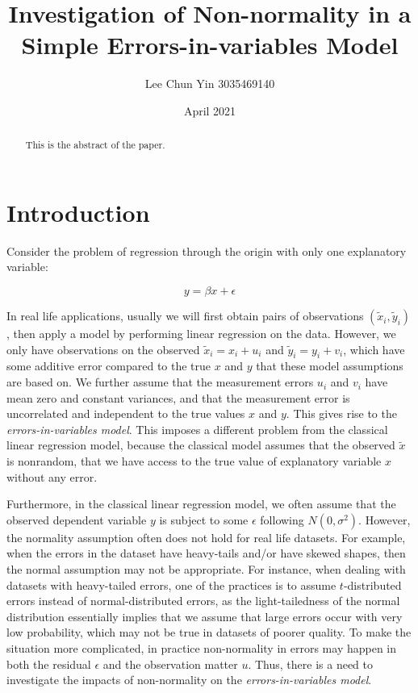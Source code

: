 \documentclass{article}
\title{Investigation of Non-normality in a Simple Errors-in-variables Model}
\author{Lee Chun Yin 3035469140}
\date{April 2021}
\begin{document}
\maketitle

\begin{abstract}
    This is the abstract of the paper.
\end{abstract}

\section{Introduction}

Consider the problem of regression through the origin with only one explanatory variable:

\begin{equation}
y = \beta x + \epsilon
\end{equation}

In real life applications, usually we will first obtain pairs of observations $(\tilde{x}_i, \tilde{y}_i)$, then apply a model by performing linear regression on the data.
However, we only have observations on the observed $\tilde{x}_i = x_i + u_i$ and $\tilde{y}_i = y_i + v_i$, which have some additive error compared to the true $x$ and $y$ that these model assumptions are based on.
We further assume that the measurement errors $u_i$ and $v_i$ have mean zero and constant variances, and that the measurement error is uncorrelated and independent to the true values $x$ and $y$.
This gives rise to the \textit{errors-in-variables model}.
This imposes a different problem from the classical linear regression model, because the classical model assumes that the observed $\tilde{x}$ is nonrandom, that we have access to the true value of explanatory variable $x$ without any error. 

Furthermore, in the classical linear regression model, we often assume that the observed dependent variable $y$ is subject to some $\epsilon$ following $N(0, \sigma^2)$.
However, the normality assumption often does not hold for real life datasets.
For example, when the errors in the dataset have heavy-tails and/or have skewed shapes, then the normal assumption may not be appropriate.
For instance, when dealing with datasets with heavy-tailed errors, one of the practices is to assume $t$-distributed errors instead of normal-distributed errors,
as the light-tailedness of the normal distribution essentially implies that we assume that large errors occur with very low probability, which may not be true in datasets of poorer quality.
To make the situation more complicated, in practice non-normality in errors may happen in both the residual $\epsilon$ and the observation matter $u$.
Thus, there is a need to investigate the impacts of non-normality on the \textit{errors-in-variables model}. 
\end{document}
